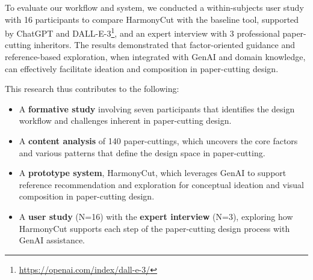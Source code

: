 To evaluate our workflow and system, we conducted a within-subjects user study with 16 participants to compare HarmonyCut with the baseline tool, supported by ChatGPT and DALL-E-3\footnote{\url{https://openai.com/index/dall-e-3/}}, and an expert interview with 3 professional paper-cutting inheritors. The results demonstrated that factor-oriented guidance and reference-based exploration, when integrated with GenAI and domain knowledge, can effectively facilitate ideation and composition in paper-cutting design.






This research thus contributes to the following:
\begin{itemize}
    \item A \textbf{formative study} involving seven participants that identifies the design workflow and challenges inherent in paper-cutting design.
    \item A \textbf{content analysis} of 140 paper-cuttings, which uncovers the core factors and various patterns that define the design space in paper-cutting. 
    \item A \textbf{prototype system}, HarmonyCut, which leverages GenAI to support reference recommendation and exploration for conceptual ideation and visual composition in paper-cutting design.
    \item A \textbf{user study} (N=16) with the \textbf{expert interview} (N=3), exploring how HarmonyCut supports each step of the paper-cutting design process with GenAI assistance.
\end{itemize}